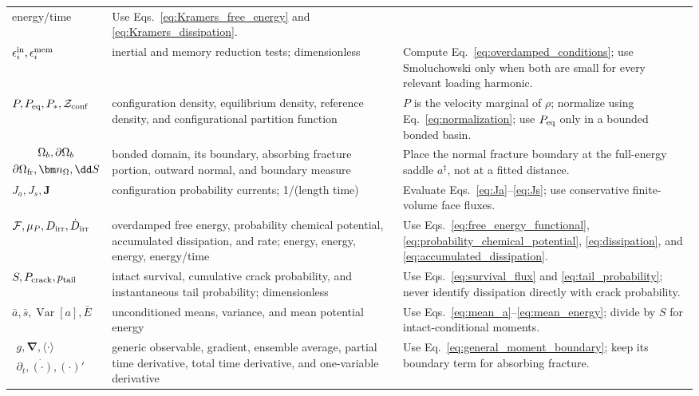 \begin{longtable}{>{\raggedright\arraybackslash}p{}
                  >{\raggedright\arraybackslash}p{}
                  >{\raggedright\arraybackslash}p{}}
energy/time & Use Eqs.~\eqref{eq:Kramers_free_energy} and \eqref{eq:Kramers_dissipation}.\\
$\epsilon_i^{\rm in},\epsilon_i^{\rm mem}$ & inertial and memory reduction tests; dimensionless &
Compute Eq.~\eqref{eq:overdamped_conditions}; use Smoluchowski only when both are small for every
relevant loading harmonic.\\
$P,P_{\rm eq},P_*,\mathcal Z_{\rm conf}$ & configuration density, equilibrium density, reference
density, and configurational partition function & $P$ is the velocity marginal of $\rho$; normalize
using Eq.~\eqref{eq:normalization}; use $P_{\rm eq}$ only in a bounded bonded basin.\\
$\begin{gathered}\Omega_b,\partial\Omega_b\\\partial\Omega_{\rm fr},\bm n_\Omega,\dd S\end{gathered}$ & bonded domain, its
boundary, absorbing fracture portion, outward normal, and boundary measure & Place the normal
fracture boundary at the full-energy saddle $a^\ddagger$, not at a fitted distance.\\
$J_a,J_s,\bm J$ & configuration probability currents; 1/(length time) & Evaluate
Eqs.~\eqref{eq:Ja}--\eqref{eq:Js}; use conservative finite-volume face fluxes.\\
$\mathcal F,\mu_P,D_{\rm irr},\dot D_{\rm irr}$ & overdamped free energy, probability chemical
potential, accumulated dissipation, and rate; energy, energy, energy, energy/time & Use
Eqs.~\eqref{eq:free_energy_functional}, \eqref{eq:probability_chemical_potential},
\eqref{eq:dissipation}, and \eqref{eq:accumulated_dissipation}.\\
$S,P_{\rm crack},p_{\rm tail}$ & intact survival, cumulative crack probability, and instantaneous
tail probability; dimensionless & Use Eqs.~\eqref{eq:survival_flux} and
\eqref{eq:tail_probability}; never identify dissipation directly with crack probability.\\
$\bar a,\bar s,\operatorname{Var}[a],\bar E$ & unconditioned means, variance, and mean potential
energy & Use Eqs.~\eqref{eq:mean_a}--\eqref{eq:mean_energy}; divide by $S$ for intact-conditional
moments.\\
$\begin{gathered}g,\bm\nabla,\langle\cdot\rangle\\\partial_t,\dot{(\cdot)},(\cdot)'\end{gathered}$ & generic observable, gradient,
ensemble average, partial time derivative, total time derivative, and one-variable derivative &
Use Eq.~\eqref{eq:general_moment_boundary}; keep its boundary term for absorbing fracture.\\
\end{longtable}


